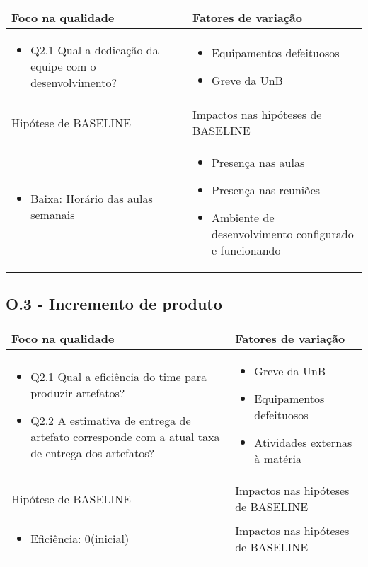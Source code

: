 	\begin{tabular}{ |p{6cm}|p{6cm}|  }
	 \hline
	 Foco na qualidade 		& 		Fatores de variação \\
	 \hline
	 \begin{itemize} \item Q2.1 Qual a dedicação da equipe com o desenvolvimento? \end{itemize} & \begin{itemize} \item Equipamentos defeituosos \item Greve da UnB
	 \end{itemize}\\ %
	 \hline
	 Hipótese de BASELINE 		& 		Impactos nas hipóteses de BASELINE \\
	 \hline
	 \begin{itemize} \item Baixa: Horário das aulas semanais  \end{itemize} 		& 		\begin{itemize} \item Presença nas aulas \item Presença nas reuniões 
	 \item Ambiente de desenvolvimento configurado e funcionando \end{itemize} \\
	 \hline
	\end{tabular}

\subsection{O.3 - Incremento de produto}

	\begin{tabular}{ |p{6cm}|p{6cm}|  }
	 \hline
	 Foco na qualidade 		& 		Fatores de variação \\
	 \hline
	 \begin{itemize} \item Q2.1 Qual a eficiência do time para produzir artefatos? \item Q2.2 A estimativa de entrega de artefato corresponde com a atual taxa de entrega dos artefatos?\end{itemize} & \begin{itemize} \item Greve da UnB \item Equipamentos defeituosos \item Atividades externas à matéria \end{itemize}\\
	 \hline
	 Hipótese de BASELINE 		& 		Impactos nas hipóteses de BASELINE \\
	 \hline
	 \begin{itemize} \item Eficiência: 0(inicial) \end{itemize} 		& 		Impactos nas hipóteses de BASELINE \\
	 \hline
	\end{tabular}
